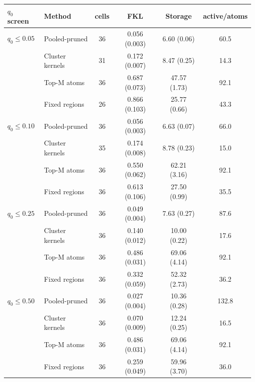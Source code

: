 \begin{tabular}{llcccc}
\toprule
$q_0$ screen & Method & cells & FKL & Storage & active/atoms \\
\midrule
$q_0\le0.05$ & Pooled-pruned & 36 & 0.056 (0.003) & 6.60 (0.06) & 60.5 \\
 & Cluster kernels & 31 & 0.172 (0.007) & 8.47 (0.25) & 14.3 \\
 & Top-M atoms & 36 & 0.687 (0.073) & 47.57 (1.73) & 92.1 \\
 & Fixed regions & 26 & 0.866 (0.103) & 25.77 (0.66) & 43.3 \\
\addlinespace
$q_0\le0.10$ & Pooled-pruned & 36 & 0.056 (0.003) & 6.63 (0.07) & 66.0 \\
 & Cluster kernels & 35 & 0.174 (0.008) & 8.78 (0.23) & 15.0 \\
 & Top-M atoms & 36 & 0.550 (0.062) & 62.21 (3.16) & 92.1 \\
 & Fixed regions & 36 & 0.613 (0.106) & 27.50 (0.99) & 35.5 \\
\addlinespace
$q_0\le0.25$ & Pooled-pruned & 36 & 0.049 (0.004) & 7.63 (0.27) & 87.6 \\
 & Cluster kernels & 36 & 0.140 (0.012) & 10.00 (0.22) & 17.6 \\
 & Top-M atoms & 36 & 0.486 (0.031) & 69.06 (4.14) & 92.1 \\
 & Fixed regions & 36 & 0.332 (0.059) & 52.32 (2.73) & 36.2 \\
\addlinespace
$q_0\le0.50$ & Pooled-pruned & 36 & 0.027 (0.004) & 10.36 (0.28) & 132.8 \\
 & Cluster kernels & 36 & 0.070 (0.009) & 12.24 (0.25) & 16.5 \\
 & Top-M atoms & 36 & 0.486 (0.031) & 69.06 (4.14) & 92.1 \\
 & Fixed regions & 36 & 0.259 (0.049) & 59.96 (3.70) & 36.0 \\
\bottomrule
\end{tabular}
